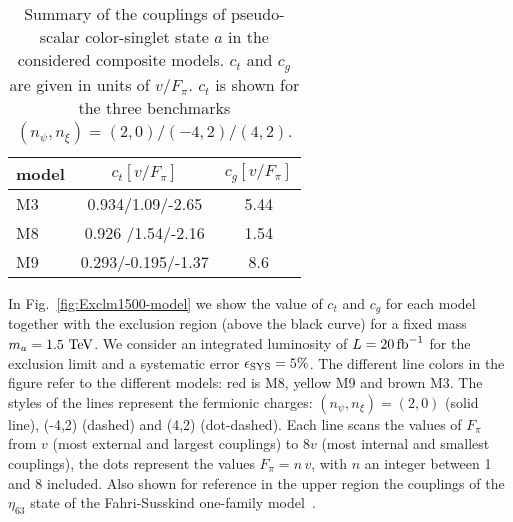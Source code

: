 \documentclass[aps,prd,amsmath,amssymb,superscriptaddress, preprintnumbers,preprint,nofootinbib,a4paper]{revtex4}
\newcommand{\TeV}{\,\text{TeV}}
\newcommand{\ifb}{\,{\rm fb}^{-1}}
\begin{document}

\begin{table}
\caption{
Summary of the couplings of pseudo-scalar color-singlet state $a$ in the considered composite models. $c_t$ and $c_g$ are given in units of $v/F_\pi$. $c_t$ is shown for the three benchmarks $(n_\psi,n_\xi)=(2,0)/(-4,2)/(4,2)$. }
\label{tab:models}
\begin{tabular}{ l c c }
 model 		& $\quad c_t[v/F_\pi]\quad$ & $c_g[v/F_\pi]$ \\
 \hline\hline
M3			& 0.934/1.09/-2.65		& 5.44	\\
M8			& 0.926 /1.54/-2.16		& 1.54	\\
M9		    & 0.293/-0.195/-1.37 		& 8.6	\\
\hline
\end{tabular}
\end{table}

In Fig.~\ref{fig:Exclm1500-model} we show the value of $c_t$ and $c_g$ for each model together with the exclusion region (above the black curve) for a fixed mass $ m_a=1.5\,{\rm \TeV}$. We consider an integrated luminosity of $L=20\ifb$ for the exclusion limit and a systematic error $\epsilon_{\rm SYS}=5\%$.
The different line colors in the figure refer to the different models: red is M8, yellow M9 and brown M3. The styles of the lines represent the fermionic charges: $(n_\psi,n_\xi)=(2,0)$ (solid line), (-4,2) (dashed) and (4,2) (dot-dashed). 
Each line scans the values of $F_\pi$ from $v$ (most external and largest couplings) to $8v$ (most internal and smallest couplings), the dots represent the values     $F_\pi=n\,v$, with $n$ an integer between 1 and 8 included.
Also shown for reference in the upper region the couplings of the $\eta_{63}$ state of the Fahri-Susskind one-family model~\cite{Farhi:1980xs}.
\end{document}
